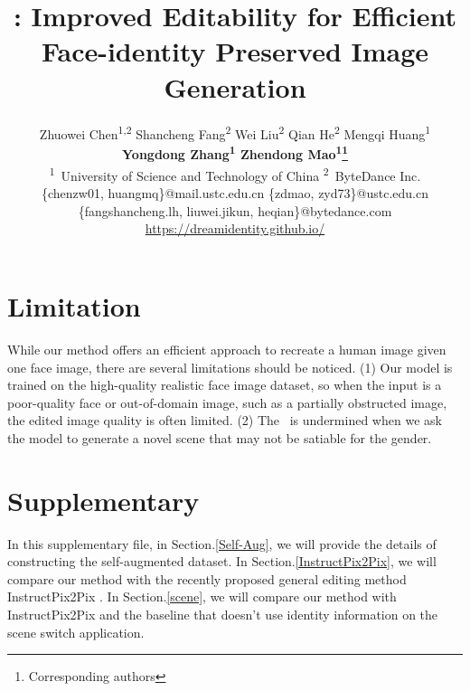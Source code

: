 \documentclass{article}
\title{\ours: 
Improved Editability for Efficient Face-identity Preserved Image Generation}
\author{
    Zhuowei Chen\textsuperscript{\rm 1,2}\quad 
    Shancheng Fang\textsuperscript{\rm 2}\quad  
    Wei Liu\textsuperscript{\rm 2} \quad Qian He\textsuperscript{\rm 2} \quad
    Mengqi Huang\textsuperscript{\rm 1}\\ 
    \textbf{Yongdong Zhang\textsuperscript{\rm 1}\quad
    Zhendong Mao\textsuperscript{\rm 1}\thanks{Corresponding authors} }\\
    \textsuperscript{\rm 1}~University of Science and Technology of China \quad 
    \textsuperscript{\rm 2}~ByteDance Inc.\quad  \\
    \{chenzw01, huangmq\}@mail.ustc.edu.cn \quad \{zdmao, zyd73\}@ustc.edu.cn \\
    \{fangshancheng.lh, liuwei.jikun, heqian\}@bytedance.com\\
\textcolor{red}{\url{https://dreamidentity.github.io/}}
}
\begin{document}
\maketitle


\vspace{-0.3cm}



\section{Limitation}
\setParDis
While our method offers an efficient approach to recreate a human image given one face image, there are several limitations should be noticed. (1) Our model is trained on the high-quality realistic face image dataset, so when the input is a poor-quality face or out-of-domain image, such as a partially obstructed image, the edited image quality is often limited. (2) The \editb \  is undermined when we ask the model to generate a novel scene that may not be satiable for the gender.
\setParDef
% 




\clearpage


\section*{Supplementary}

In this supplementary file, in Section.\ref{Self-Aug}, we will provide the details of constructing the self-augmented dataset. 
In Section.\ref{InstructPix2Pix}, we will compare our method with the recently proposed general editing method InstructPix2Pix \cite{brooks2022instructpix2pix}. In Section.\ref{scene}, we will compare our method with InstructPix2Pix and the baseline that doesn't use identity information on the scene switch application.





\appendix
\renewcommand\thesection{\Alph{section}}
\end{document}
